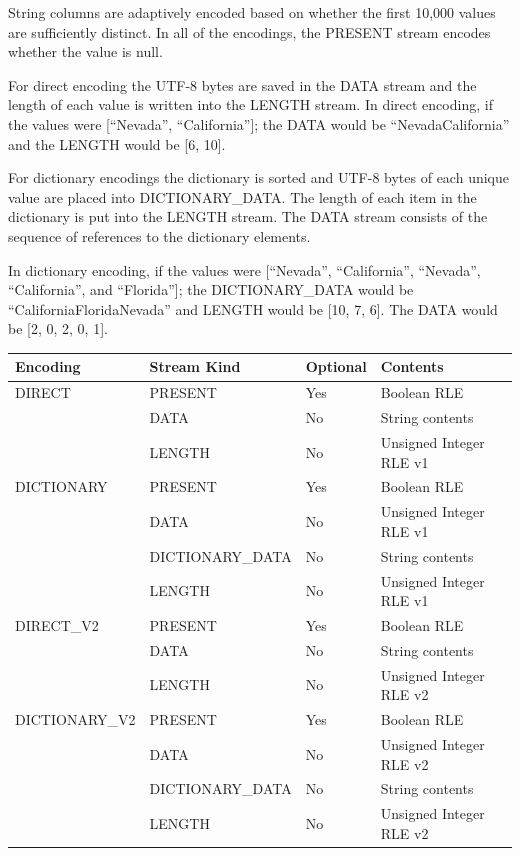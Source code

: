 \documentclass{article}
\begin{document}
String columns are adaptively encoded based on whether the first
10,000 values are sufficiently distinct. In all of the encodings, the
PRESENT stream encodes whether the value is null.

For direct encoding the UTF-8 bytes are saved in the DATA stream and
the length of each value is written into the LENGTH stream. In direct
encoding, if the values were [``Nevada'', ``California'']; the DATA
would be ``NevadaCalifornia'' and the LENGTH would be [6, 10].

For dictionary encodings the dictionary is sorted and UTF-8 bytes of
each unique value are placed into DICTIONARY\_DATA. The length of each
item in the dictionary is put into the LENGTH stream. The DATA stream
consists of the sequence of references to the dictionary elements.

In dictionary encoding, if the values were [``Nevada'',
  ``California'', ``Nevada'', ``California'', and ``Florida'']; the
DICTIONARY\_DATA would be ``CaliforniaFloridaNevada'' and LENGTH would
be [10, 7, 6]. The DATA would be [2, 0, 2, 0, 1].

\vspace{10pt}
\begin{tabular}{| l | l | l | l |}
\hline
Encoding & Stream Kind & Optional & Contents \\
\hline
DIRECT & PRESENT & Yes & Boolean RLE\\
       & DATA    & No  & String contents\\
       & LENGTH  & No  & Unsigned Integer RLE v1\\
\hline
DICTIONARY & PRESENT          & Yes & Boolean RLE\\
           & DATA             & No  & Unsigned Integer RLE v1\\
           & DICTIONARY\_DATA & No  & String contents\\
           & LENGTH           & No  & Unsigned Integer RLE v1\\
\hline
DIRECT\_V2 & PRESENT & Yes & Boolean RLE\\
          & DATA    & No  & String contents\\
          & LENGTH  & No  & Unsigned Integer RLE v2\\
\hline
DICTIONARY\_V2 & PRESENT          & Yes & Boolean RLE\\
               & DATA             & No  & Unsigned Integer RLE v2\\
               & DICTIONARY\_DATA & No  & String contents\\
               & LENGTH           & No  & Unsigned Integer RLE v2\\
\hline
\end{tabular}
\end{document}
